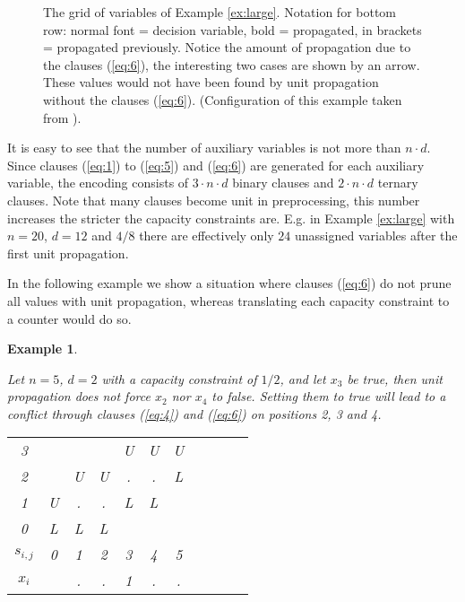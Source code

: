 \documentclass[]{easychair}
\newtheorem{example}[theorem]{Example}
\begin{document}
\begin{figure}
\centering 
\caption{The grid of variables of Example \ref{ex:large}. Notation for bottom row: normal font = decision variable, bold
    = propagated, in brackets = propagated previously. Notice the amount of propagation due to the clauses (\ref{eq:6}),
    the interesting two cases are shown by an arrow. These values would not have been found by unit propagation without
    the clauses (\ref{eq:6}). (Configuration of this example taken from
\cite{Siala12}).}


\label{fig3}
\end{figure}

It is easy to see that the number of auxiliary variables is not more than $n\cdot d$. Since clauses (\ref{eq:1}) to
(\ref{eq:5}) and (\ref{eq:6}) are generated for each auxiliary variable, the encoding consists of $3\cdot n \cdot d$
binary clauses and $2 \cdot n \cdot d$ ternary clauses. Note that many clauses become unit in preprocessing, this number
increases the stricter the capacity constraints are. E.g. in Example \ref{ex:large} with $n=20$, $d=12$ and $4/8$ there are
effectively only $24$ unassigned variables after the first unit propagation. 

In the following example we show a situation where clauses (\ref{eq:6}) do not prune all values with unit propagation,
whereas translating each capacity constraint to a counter would do so. 

\begin{example}\label{ex:small}
 \begin{minipage}[c]{.58\linewidth} Let $n=5$, $d=2$ with a capacity constraint of $1/2$, and let $x_3$ be true, then
     unit propagation does not force $x_2$ nor $x_4$ to false. Setting them to true will lead to a conflict through
     clauses (\ref{eq:4}) and (\ref{eq:6}) on positions 2, 3 and 4.
   \end{minipage} \hfill
   \begin{minipage}[c]{.36\linewidth}
\begin{center}
\begin{small}
\begin{tabular}{c|cccccccccc}
3   &   &   &   &U  &U  &U  \\
2   &   &U  &U  &.  &.  &L  \\
1   &U  &.  &.  &L  &L  &   \\
0   &L  &L  &L  &   &   &   \\
\hline
$s_{i,j}$ &0  &1  &2  &3  &4  &5 \\
$x_i$     &  &.  &.  &1  &.  &.  \\
\end{tabular}
\end{small} 
\end{center}     
   \end{minipage}
\end{example}
\end{document}
